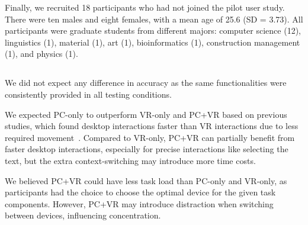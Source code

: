  Finally, we recruited 18 participants
 who had not joined the pilot user study.
There were ten males and eight females, with a mean age of 25.6 (SD = 3.73). All participants were graduate students from different majors: computer science (12), linguistics (1), material (1), art (1), bioinformatics (1), construction management (1), and physics (1). 


\subsection{}


 \label{hypo:acc} We did not expect any difference in accuracy as the same functionalities were consistently provided in all testing conditions.

 \label{hypo:tim} We expected PC-only to outperform VR-only and PC+VR based on previous studies, which found desktop interactions faster than VR interactions due to less required movement~\cite{bach2017hologram,chen2012effects,wagner2018immersive,arms1999benefits}. Compared to VR-only, PC+VR can partially benefit from faster desktop interactions, especially for precise interactions like selecting the text, but the extra context-switching may introduce more time costs.

 \label{hypo:exp} We believed PC+VR could have less task load than PC-only and VR-only, as participants had the choice to choose the optimal device for the given task components.
However, PC+VR may introduce distraction when switching between devices, influencing concentration.

